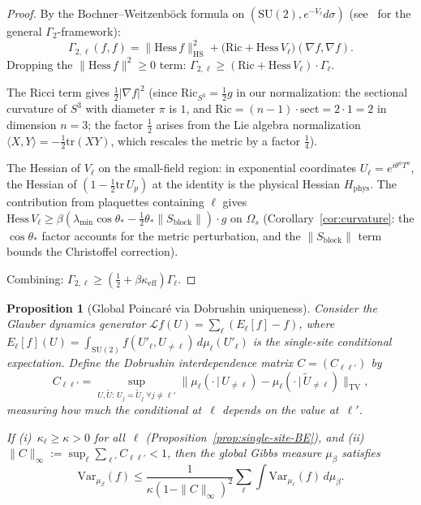 \documentclass[11pt]{article}
\newtheorem{proposition}[theorem]{Proposition}
\theoremstyle{definition}
\newcommand{\SU}{\mathrm{SU}}
\newcommand{\tr}{\mathrm{tr}}
\begin{document}
\begin{proof}
By the Bochner--Weitzenb\"ock formula on
$(\SU(2),e^{-V_\ell}d\sigma)$
(see~\cite{BakryEmery,Fontes2026BE} for the general
$\Gamma_2$-framework):
\begin{equation}
\Gamma_{2,\ell}(f,f)
=\|\mathrm{Hess}\,f\|_{\mathrm{HS}}^2
+\bigl(\mathrm{Ric}+\mathrm{Hess}\,V_\ell\bigr)
(\nabla f,\nabla f).
\end{equation}
Dropping the $\|\mathrm{Hess}\,f\|^2\ge 0$ term:
$\Gamma_{2,\ell}\ge(\mathrm{Ric}+\mathrm{Hess}\,V_\ell)\cdot\Gamma_\ell$.

The Ricci term gives $\frac{1}{2}|\nabla f|^2$ (since
$\mathrm{Ric}_{S^3}=\frac{1}{2}g$ in our normalization: the
sectional curvature of $S^3$ with diameter $\pi$ is $1$, and
$\mathrm{Ric}=(n-1)\cdot\mathrm{sect}=2\cdot 1=2$ in dimension $n=3$;
the factor $\frac{1}{2}$ arises from the Lie algebra normalization
$\langle X,Y\rangle=-\frac{1}{2}\tr(XY)$, which rescales the metric
by a factor $\frac{1}{4}$).

The Hessian of $V_\ell$ on the small-field region: in exponential
coordinates $U_\ell=e^{i\theta^a T^a}$, the Hessian of
$(1-\frac{1}{2}\tr\,U_p)$ at the identity is the physical Hessian
$H_{\mathrm{phys}}$.  The contribution from plaquettes containing
$\ell$ gives
$\mathrm{Hess}\,V_\ell\ge\beta(\lambda_{\min}\cos\theta_*
-\frac{1}{2}\theta_*\|S_{\mathrm{block}}\|)\cdot g$
on $\Omega_s$
(Corollary~\ref{cor:curvature}: the $\cos\theta_*$ factor accounts
for the metric perturbation, and the $\|S_{\mathrm{block}}\|$ term
bounds the Christoffel correction).

Combining: $\Gamma_{2,\ell}\ge(\frac{1}{2}+\beta\kappa_{\mathrm{eff}})\Gamma_\ell$.
\end{proof}

\begin{proposition}[Global Poincar\'e via Dobrushin uniqueness]%
\label{prop:global-poincare}
Consider the Glauber dynamics generator
$\mathcal{L}f(U)=\sum_\ell(E_\ell[f]-f)$,
where $E_\ell[f](U)=\int_{\SU(2)}f(U'_\ell,U_{\neq\ell})\,
d\mu_\ell(U'_\ell)$ is the single-site conditional expectation.
Define the \emph{Dobrushin interdependence matrix}
$C=(C_{\ell\ell'})$ by
\begin{equation}\label{eq:dobrushin}
C_{\ell\ell'}=\sup_{U,\tilde{U}:\,U_j=\tilde{U}_j\;\forall j\ne\ell'}
\|\mu_\ell(\cdot\,|\,U_{\neq\ell})
-\mu_\ell(\cdot\,|\,\tilde{U}_{\neq\ell})\|_{\mathrm{TV}},
\end{equation}
measuring how much the conditional at~$\ell$ depends on the
value at~$\ell'$.

If (i)~$\kappa_\ell\ge\kappa>0$ for all~$\ell$
(Proposition~\ref{prop:single-site-BE}),
and (ii)~$\|C\|_\infty:=\sup_\ell\sum_{\ell'}C_{\ell\ell'}<1$,
then the global Gibbs measure $\mu_\beta$ satisfies
\begin{equation}\label{eq:global-poincare}
\mathrm{Var}_{\mu_\beta}(f)
\le\frac{1}{\kappa(1-\|C\|_\infty)^2}
\sum_\ell\int\mathrm{Var}_{\mu_\ell}(f)\,d\mu_\beta.
\end{equation}
\end{proposition}
\end{document}
